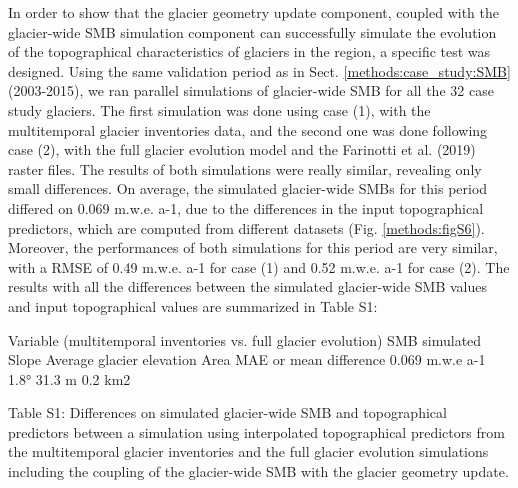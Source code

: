 In order to show that the glacier geometry update component, coupled with the glacier-wide SMB simulation component can successfully simulate the evolution of the topographical characteristics of glaciers in the region, a specific test was designed. Using the same validation period as in Sect. \ref{methods:case_study:SMB} (2003-2015), we ran parallel simulations of glacier-wide SMB for all the 32 case study glaciers. The first simulation was done using case (1), with the multitemporal glacier inventories data, and the second one was done following case (2), with the full glacier evolution model and the Farinotti et al. (2019) raster files. The results of both simulations were really similar, revealing only small differences. On average, the simulated glacier-wide SMBs for this period differed on 0.069 m.w.e. a-1, due to the differences in the input topographical predictors, which are computed from different datasets (Fig. \ref{methods:figS6}). Moreover, the performances of both simulations for this period are very similar, with a RMSE of 0.49 m.w.e. a-1 for case (1) and 0.52 m.w.e. a-1 for case (2). The results with all the differences between the simulated glacier-wide SMB values and input topographical values are summarized in Table S1:

Variable (multitemporal inventories vs. full glacier evolution)	SMB simulated	Slope 	Average glacier elevation	Area
MAE or mean difference	0.069 m.w.e a-1	1.8°	31.3 m	0.2 km2

Table S1: Differences on simulated glacier-wide SMB and topographical predictors between a simulation using interpolated topographical predictors from the multitemporal glacier inventories and the full glacier evolution simulations including the coupling of the glacier-wide SMB with the glacier geometry update. 

